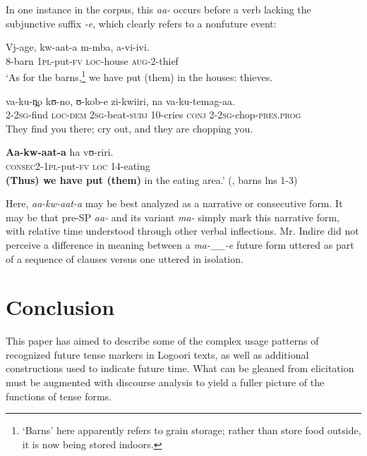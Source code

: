 \documentclass[output=paper]{langsci/langscibook}
\begin{document}
In one instance in the corpus, this\textit{ aa-} occurs before a verb lacking the subjunctive suffix \textit{-e}, which clearly refers to a nonfuture event:

\ea\label{ex:sarvasy:30}
\gll Vj-age,     kw-aat-a   m-mba,   a-vi-ivi.\\
8-barn    \textsc{1pl}-put-\textsc{fv}  \textsc{loc}-house  \textsc{aug}-2-thief \\
\glt ‘As for the barns,\footnote{‘Barns’ here apparently refers to grain storage; rather than store food outside, it is now being stored indoors.} we have put (them) in the houses: thieves.

\gll va-ku-n̪o   kʊ-no,   ʊ-kob-e     zi-kwiiri,   na   va-ku-temag-aa. \\
2-\textsc{2sg}-find  \textsc{loc}-\textsc{dem}  \textsc{2sg}-beat-\textsc{subj}  10-cries  \textsc{conj}  2-\textsc{2sg}-chop-\textsc{pres}.\textsc{prog} \\
\glt They find you there; cry out, and they are chopping you. 

\gll \textbf{Aa-kw-aat-a}     ha   vʊ-riri. \\
\textsc{consec2}-\textsc{1pl}-put-\textsc{fv}  \textsc{loc}  14-eating \\
\glt \textbf{(Thus) we have put (them)} in the eating area.’ (\citealt{NicholsSsennyonga1976}, barns lns 1-3)
\z

Here, \textit{aa-kw-aat-a} may be best analyzed as a narrative %
%
or consecutive form. It may be that pre-SP \textit{aa-} and its variant \textit{ma-} simply mark this narrative form, with relative time understood through other verbal inflections. Mr. Indire did not perceive a difference in meaning between a \textit{ma-\_\_-e} future form uttered as part of a sequence of clauses versus one uttered in isolation.

\section[Conclusion]{Conclusion} \label{sec:sarvasy:8}

This paper has aimed to describe some of the complex usage patterns of recognized future tense markers in Logoori texts, as well as additional constructions used to indicate future time. What can be gleaned from elicitation must be augmented with discourse analysis to yield a fuller picture of the functions of tense forms. 
\end{document}
